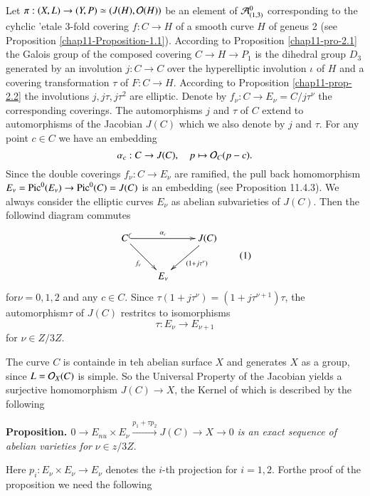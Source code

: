 Let $\pi : (X, L) \rightarrow (Y, P) \simeq (J(H), \mathcal{O}(H))$ be an element of $\mathcal{A}_{(1,3)}^{0}$ corresponding to the cyhclic 'etale 3-fold covering $f : C\rightarrow H$ of a smooth curve $H$ of geneus 2
(see Proposition \ref{chap11-Proposition-1.1}). According  to Proposition \ref{chap11-pro-2.1} the Galois group of the composed covering $C\rightarrow H \rightarrow P_{1}$ is the dihedral group $D_{3}$ generated by an involution $j : C\rightarrow C$ over the hyperelliptic involution $\iota$ of $H$ and a covering transformation $\tau$ of $F :C \rightarrow H$. According to Proposition \ref{chap11-prop-2.2} the involutions $j, j\tau, j\tau^{2}$ are elliptic. Denote by $f_{\nu} : C\rightarrow E_{\nu} = C/j\tau^{\nu}$ the corresponding coverings. The automorphisms $j$ and $\tau$ of $C$ extend to automorphisms of the Jacobian $J(C)$ which we also denote by $j$ and $\tau$. For any point $c \in C$ we have an embedding
$$
\alpha_{c}: C\rightarrow J(C),\quad p \mapsto \mathcal{O}_{C}(p-c).
$$
Since the double coverings $f_{\nu}: C \rightarrow E_{\nu}$ are ramified, the pull back homomorphism $E_{\nu} = \operatorname{Pic}^{0}(E_{\nu}) \rightarrow \operatorname{Pic}^{0}(C)=J(C)$ is an embedding (see \cite{chap11-keyL-B} Proposition 11.4.3). We always
consider the elliptic curves $E_{\nu}$ as abelian subvarieties of $J(C)$. Then the followind diagram commutes
\begin{equation*}\label{chap11-sec-eq-1}
\vcenter{
\xymatrix{
C  \ar@{^{(}->}[rr]^-{\alpha_{c}}\ar[dr]_{f_{\nu}} &  &J(C)\ar[dl]^-{(1+j\tau^{\nu})} \\
   & E_{\nu}  &
}}\tag{1}
\end{equation*}
for\pageoriginale $\nu =0,1,2$ and any $c \in C$. Since $\tau(1+j\tau^{\nu})=(1 + j\tau^{\nu+1})\tau$, the automorphism$\tau$ of $J(C)$ restritcs to isomorphisms
$$
\tau : E_{\nu} \rightarrow E_{\nu+1}
$$
for $\nu \in Z /3Z$.

 The curve $C$ is containde in teh abelian surface $X$ and generates $X$ as a group, since $L =\mathcal{O}_{X}(C)$ is simple. So the Universal Property of the Jacobian yields a surjective homomorphism $J(C)\rightarrow X$, the Kernel of which is described by the following

\medskip
\noindent
{\bfseries {} Proposition. \label{chap11-prop-5.1}}
$0\rightarrow  E_{nu} \times E_{\nu} \xrightarrow {p_{1}+\tau p_{2}}J(C) \rightarrow X \rightarrow 0$ \textit{is an exact sequence of abelian varieties for} $\nu \in z /3Z$. 

 Here $p_{i}: E_{\nu} \times E_{\nu} \rightarrow E_{\nu}$ denotes the $i$-th projection for $i=1,2$. Forthe proof of the proposition we need the following

